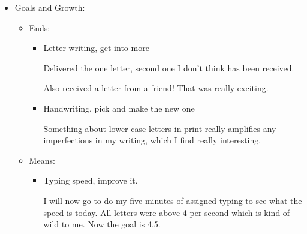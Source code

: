 \documentclass[12pt]{article}
\renewcommand{\,}{\textsuperscript{,}}
\begin{document}
\begin{itemize}
\begin{itemize}
\begin{itemize}
\item No wasted time

I generally think that I'm doing ok here.  
As I see more and more often, though, I need to remember that I cannot optimize my life fully.  
I spent about half of yesterday playing a game while getting through the youtube backlog\footnote{yes, I'm aware there's something intrinsically not sane about listening to audio at 3x speed while playing a fast paced action game.}, but I was also feeling so worn down that it might not have been helpful to work harder.

\item Eat more than 2 meals a day

I think so?  
I have vague memories of eating food the past few days, even if that might be all that I have.

\end{itemize}

\end{itemize}

\item Goals and Growth:

\begin{itemize}

\item Ends:

\begin{itemize}

\item Letter writing, get into more

Delivered the one letter, second one I don't think has been received.

Also received a letter from a friend! That was really exciting.

\item Handwriting, pick and make the new one

Something about lower case letters in print really amplifies any imperfections in my writing, which I find really interesting.

\end{itemize}

\item Means:

\begin{itemize}

\item Typing speed, improve it.

I will now go to do my five minutes of assigned typing to see what the speed is today.  
All letters were above 4 per second which is kind of wild to me. Now the goal is 4.5.


\end{itemize}
\end{itemize}
\end{itemize}
\end{document}
